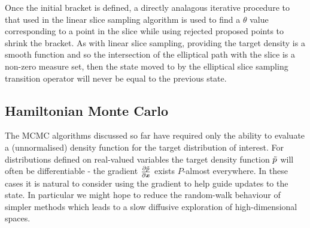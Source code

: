 Once the initial bracket is defined, a directly analagous iterative procedure to that used in the linear slice sampling algorithm is used to find a $\theta$ value corresponding to a point in the slice while using rejected proposed points to shrink the bracket. As with linear slice sampling, providing the target density is a smooth function and so the intersection of the elliptical path with the slice is a non-zero measure set, then the state moved to by the elliptical slice sampling transition operator will never be equal to the previous state.

\subsection{Hamiltonian Monte Carlo}\label{subsec:hamiltonian-monte-carlo}

The \ac{MCMC} algorithms discussed so far have required only the ability to evaluate a (unnormalised) density function for the target distribution of interest. For distributions defined on real-valued variables the target density function $\tilde{p}$ will often be differentiable - the gradient $\frac{\partial \tilde{p}}{\partial \boldsymbol{x}}$ exists $P$-almost everywhere. In these cases it is natural to consider using the gradient to help guide updates to the state. In particular we might hope to reduce the random-walk behaviour of simpler methods which leads to a slow diffusive exploration of high-dimensional spaces.

